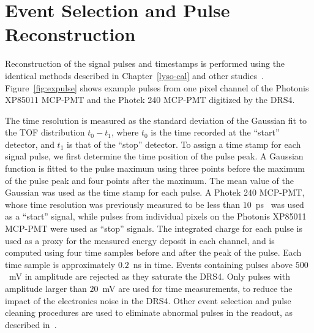 

\section{Event Selection and Pulse Reconstruction}\label{sec:reconstruction}
Reconstruction of the signal pulses and timestamps is performed using the
identical methods described in Chapter~\ref{lyso-cal} and other
studies~\cite{Anderson:2015gha,MCPFastCaloNIMA,Ronzhin:2015pba}.
Figure~\ref{fig:expulse} shows example pulses from one pixel channel of
the Photonis XP85011 MCP-PMT and the Photek 240 MCP-PMT digitized by the DRS4.

The time resolution is measured as the standard deviation of the Gaussian fit to the
TOF distribution $t_0-t_1$, where $t_0$ is the time recorded at the
``start'' detector, and $t_1$ is that of the ``stop'' detector. To assign a time
stamp for each signal pulse, we first determine the time position of the pulse
peak. A Gaussian function is fitted to the pulse maximum using three points
before the maximum of the pulse peak and four points after the maximum. The mean
value of the Gaussian was used as the time stamp for each pulse. A Photek 240
MCP-PMT, whose time resolution was previously measured to be less than
$10$~ps~\cite{Ronzhin:2015pba} was used as a ``start'' signal, while pulses from
individual pixels on the Photonis XP85011 MCP-PMT were used as
``stop'' signals. The integrated charge for each pulse is used as a
proxy for the measured energy deposit in each channel, and is computed using
four time samples before and after the peak of the pulse. Each time sample is
approximately $0.2$~ns in time. Events containing pulses above $500$~mV in
amplitude are rejected as they saturate the DRS4. Only pulses with amplitude
larger than $20$~mV are used for time measurements, to reduce the impact of the
electronics noise in the DRS4. Other event selection and pulse cleaning
procedures are used to eliminate abnormal pulses in the readout, as described
in~\cite{MCPFastCaloNIMA}. 


